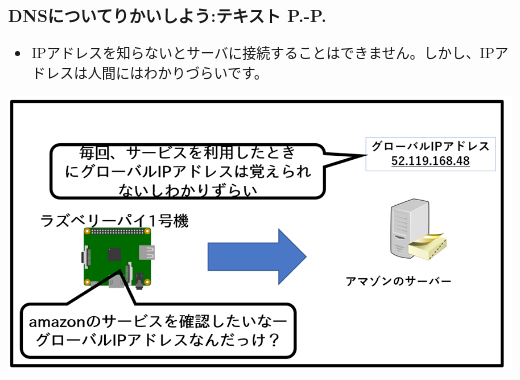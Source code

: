 \documentclass[dvipdfmx]{beamer}
\begin{document}
\begin{frame}[fragile]
	\frametitle{DNSについてりかいしよう:テキスト P.\pageref{1:P:DNS}-P.\pageref{1:P:HTML}~~~}
            \begin{itemize}
                \item IPアドレスを知らないとサーバに接続することはできません。しかし、IPアドレスは人間にはわかりづらいです。
            \end{itemize}
			\begin{minipage}{\textwidth}
                {\upshape
                  \includegraphics[width=\textwidth]{ome7-img026.png}}
            \end{minipage}
\end{frame}
\end{document}
